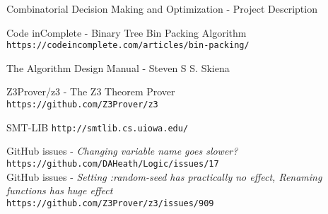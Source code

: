 \begin{thebibliography}{2}
        Combinatorial Decision Making and Optimization - Project Description
    
        Code inComplete - Binary Tree Bin Packing Algorithm\\
        \texttt{https://codeincomplete.com/articles/bin-packing/}
    
        The Algorithm Design Manual - Steven S S. Skiena 
 
 		Z3Prover/z3 - The Z3 Theorem Prover\\
 		\texttt{https://github.com/Z3Prover/z3}
        
   		SMT-LIB
        \texttt{http://smtlib.cs.uiowa.edu/}
        
        GitHub issues - \textit{Changing variable name goes slower?}\\
        \texttt{https://github.com/DAHeath/Logic/issues/17}\\
        GitHub issues - \textit{Setting :random-seed has practically no effect, Renaming functions has huge effect}\\
        \texttt{https://github.com/Z3Prover/z3/issues/909}
\end{thebibliography}